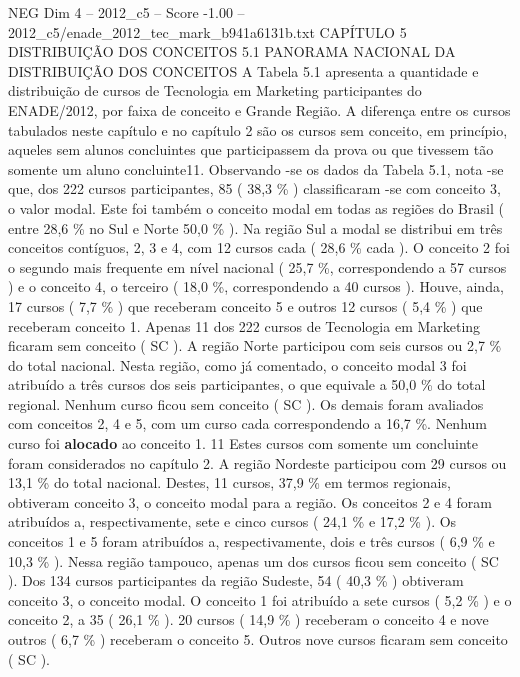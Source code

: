\begin{textsample}{NEG Dim 4 – 2012\_c5 – Score -1.00 – 2012\_c5/enade\_2012\_tec\_mark\_b941a6131b.txt}  \label{ex:f4_neg_101}
CAPÍTULO 5 DISTRIBUIÇÃO DOS CONCEITOS 5.1 PANORAMA NACIONAL DA DISTRIBUIÇÃO DOS CONCEITOS A Tabela 5.1 apresenta a quantidade e distribuição de cursos de Tecnologia em Marketing participantes do ENADE/2012, por faixa de conceito e Grande Região.
A diferença entre os cursos tabulados neste capítulo e no capítulo 2 são os cursos sem conceito, em princípio, aqueles sem alunos concluintes que participassem da prova ou que tivessem tão somente um aluno concluinte11.
Observando -se os dados da Tabela 5.1, nota -se que, dos 222 cursos participantes, 85 ( 38,3 \% ) classificaram -se com conceito 3, o valor modal.
Este foi também o conceito modal em todas as regiões do Brasil ( entre 28,6 \% no Sul e Norte 50,0 \% ).
Na região Sul a modal se distribui em três conceitos contíguos, 2, 3 e 4, com 12 cursos cada ( 28,6 \% cada ).
O conceito 2 foi o segundo mais frequente em nível nacional ( 25,7 \%, correspondendo a 57 cursos ) e o conceito 4, o terceiro ( 18,0 \%, correspondendo a 40 cursos ).
Houve, ainda, 17 cursos ( 7,7 \% ) que receberam conceito 5 e outros 12 cursos ( 5,4 \% ) que receberam conceito 1.
Apenas 11 dos 222 cursos de Tecnologia em Marketing ficaram sem conceito ( SC ).
A região Norte participou com seis cursos ou 2,7 \% do total nacional.
Nesta região, como já comentado, o conceito modal 3 foi atribuído a três cursos dos seis participantes, o que equivale a 50,0 \% do total regional.
Nenhum curso ficou sem conceito ( SC ).
Os demais foram avaliados com conceitos 2, 4 e 5, com um curso cada correspondendo a 16,7 \%.
Nenhum curso foi \textbf{alocado} ao conceito 1. 11 Estes cursos com somente um concluinte foram considerados no capítulo 2.
A região Nordeste participou com 29 cursos ou 13,1 \% do total nacional.
Destes, 11 cursos, 37,9 \% em termos regionais, obtiveram conceito 3, o conceito modal para a região.
Os conceitos 2 e 4 foram atribuídos a, respectivamente, sete e cinco cursos ( 24,1 \% e 17,2 \% ).
Os conceitos 1 e 5 foram atribuídos a, respectivamente, dois e três cursos ( 6,9 \% e 10,3 \% ).
Nessa região tampouco, apenas um dos cursos ficou sem conceito ( SC ).
Dos 134 cursos participantes da região Sudeste, 54 ( 40,3 \% ) obtiveram conceito 3, o conceito modal.
O conceito 1 foi atribuído a sete cursos ( 5,2 \% ) e o conceito 2, a 35 ( 26,1 \% ). 20 cursos ( 14,9 \% ) receberam o conceito 4 e nove outros ( 6,7 \% ) receberam o conceito 5.
Outros nove cursos ficaram sem conceito ( SC ).

\end{textsample}
